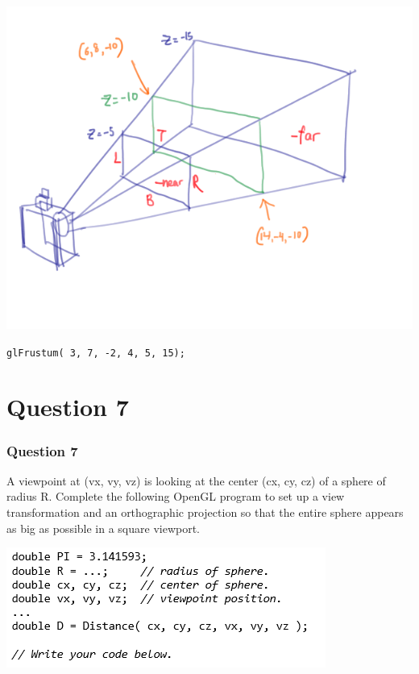 \documentclass{beamer}
\begin{document}
\begin{frame}

    \begin{center}
        \includegraphics[scale=1.2]{glFrustum-demo.png}
    \end{center}

    \begin{tcolorbox}[colback=violet!5!white]
        \begin{center}
            \texttt{glFrustum( 3, 7, -2, 4, 5, 15);}
        \end{center}
    \end{tcolorbox}

\end{frame}

\section{Question 7}

\begin{frame}
    \frametitle{Question 7}
    A viewpoint at (vx, vy, vz) is looking at the center (cx, cy, cz) 
    of a sphere of radius R. Complete the following OpenGL program to 
    set up a view transformation and an orthographic projection 
    so that the entire sphere appears as big as possible in a 
    square viewport.

    \vspace{1em}

    \includegraphics[]{q7-qn.png}
    

\end{frame}
\end{document}
